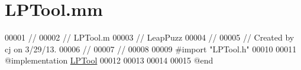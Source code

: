 \hypertarget{_l_p_tool_8mm}{\section{L\-P\-Tool.\-mm}
\label{d9/db1/_l_p_tool_8mm}
}

\begin{DoxyCode}
00001 \textcolor{comment}{//}
00002 \textcolor{comment}{//  LPTool.m}
00003 \textcolor{comment}{//  LeapPuzz}
00004 \textcolor{comment}{//}
00005 \textcolor{comment}{//  Created by cj on 3/29/13.}
00006 \textcolor{comment}{//}
00007 \textcolor{comment}{//}
00008 
00009 \textcolor{preprocessor}{#import "LPTool.h"}
00010 
00011 \textcolor{keyword}{@implementation }\hyperlink{interface_l_p_tool}{LPTool}
00012 
00013 
00014 
00015 \textcolor{keyword}{@end}
\end{DoxyCode}
